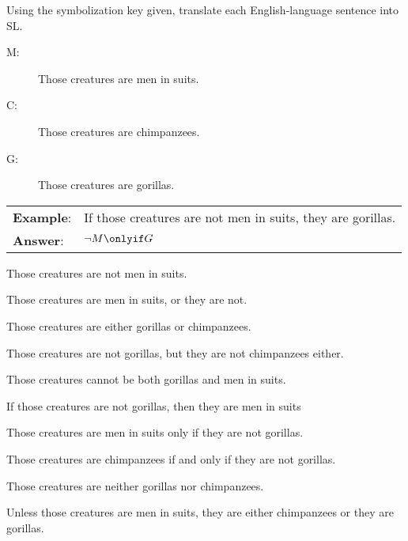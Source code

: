 
\practiceproblems
\noindent\problempart Using the symbolization key given, translate each English-language sentence into SL.
\label{pr.monkeysuits}
\begin{description}
\item[M:] Those creatures are men in suits.
\item[C:] Those creatures are chimpanzees.
\item[G:] Those creatures are gorillas.
\end{description}

\begin{longtabu}{p{.1\linewidth}p{.9\linewidth}}
\textbf{Example}: & If those creatures are not men in suits, they are gorillas. \\
\textbf{Answer}: & $\lnot M \onlyif G$ \\
\end{longtabu}


\begin{exercises}
\item Those creatures are not men in suits. 
\item Those creatures are men in suits, or they are not. 
\item Those creatures are either gorillas or chimpanzees. 
\item Those creatures are not gorillas, but they are not chimpanzees either. 
\item Those creatures cannot be both gorillas and men in suits. 
\item If those creatures are not gorillas, then they are men in suits 
\item Those creatures are men in suits only if they are not gorillas. 
\item Those creatures are chimpanzees if and only if they are not gorillas. 
\item Those creatures are neither gorillas nor chimpanzees.  %
\item Unless those creatures are men in suits, they are either chimpanzees or they are gorillas. 
\end{exercises}


